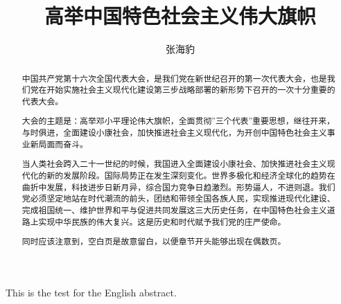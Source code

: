 \documentclass{njuthesis}
\title{高举中国特色社会主义伟大旗帜}
\author{张海豹}
\begin{document}
\maketitle
\makeenglishtitle

\begin{abstract}
中国共产党第十六次全国代表大会，是我们党在新世纪召开的第一次代表大会，也是我们党在开始实施社会主义现代化建设第三步战略部署的新形势下召开的一次十分重要的代表大会。 

大会的主题是：高举邓小平理论伟大旗帜，全面贯彻”三个代表”重要思想，继往开来，与时俱进，全面建设小康社会，加快推进社会主义现代化，为开创中国特色社会主义事业新局面而奋斗。 

当人类社会跨入二十一世纪的时候，我国进入全面建设小康社会、加快推进社会主义现代化的新的发展阶段。国际局势正在发生深刻变化。世界多极化和经济全球化的趋势在曲折中发展，科技进步日新月异，综合国力竞争日趋激烈。形势逼人，不进则退。我们党必须坚定地站在时代潮流的前头，团结和带领全国各族人民，实现推进现代化建设、完成祖国统一、维护世界和平与促进共同发展这三大历史任务，在中国特色社会主义道路上实现中华民族的伟大复兴。这是历史和时代赋予我们党的庄严使命。 

同时应该注意到，空白页是故意留白，以便章节开头能够出现在偶数页。
\end{abstract}

\begin{englishabstract}
This is the test for the English abstract.
\end{englishabstract}
\end{document}
